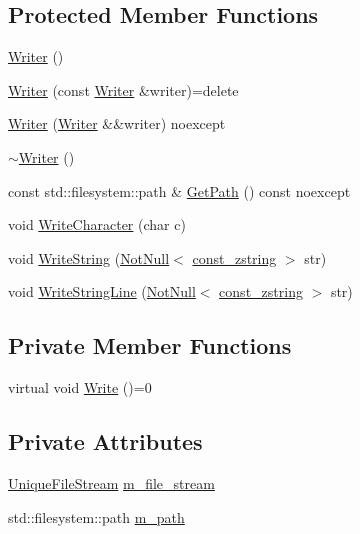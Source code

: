 \subsection*{Protected Member Functions}
\begin{DoxyCompactItemize}
\item 
\mbox{\hyperlink{classmage_1_1_writer_a40b6cd3005d509e670c5a49272d9ef27}{Writer}} ()
\item 
\mbox{\hyperlink{classmage_1_1_writer_a2b257938508732ca0b78241aafa7922c}{Writer}} (const \mbox{\hyperlink{classmage_1_1_writer}{Writer}} \&writer)=delete
\item 
\mbox{\hyperlink{classmage_1_1_writer_abda6f6db577201580c0e97c0816e0d3f}{Writer}} (\mbox{\hyperlink{classmage_1_1_writer}{Writer}} \&\&writer) noexcept
\item 
\mbox{\hyperlink{classmage_1_1_writer_aeeb30d6afb1a271b4ad294889054caec}{$\sim$\+Writer}} ()
\item 
const std\+::filesystem\+::path \& \mbox{\hyperlink{classmage_1_1_writer_ab023ae8174132f233c6e1fa4d3a2a1c8}{Get\+Path}} () const noexcept
\item 
void \mbox{\hyperlink{classmage_1_1_writer_aa1ef04f5e69c44afda56704c2823316c}{Write\+Character}} (char c)
\item 
void \mbox{\hyperlink{classmage_1_1_writer_a0efdf73186727b2ae95072b62eddcf5b}{Write\+String}} (\mbox{\hyperlink{namespacemage_a8769f9d670d6b585ea306cb1062af94b}{Not\+Null}}$<$ \mbox{\hyperlink{namespacemage_abfd9206dc607ceb5d13ec68bf075a5c0}{const\+\_\+zstring}} $>$ str)
\item 
void \mbox{\hyperlink{classmage_1_1_writer_abdfd1361df7bb66e284d031f92c85c05}{Write\+String\+Line}} (\mbox{\hyperlink{namespacemage_a8769f9d670d6b585ea306cb1062af94b}{Not\+Null}}$<$ \mbox{\hyperlink{namespacemage_abfd9206dc607ceb5d13ec68bf075a5c0}{const\+\_\+zstring}} $>$ str)
\end{DoxyCompactItemize}
\subsection*{Private Member Functions}
\begin{DoxyCompactItemize}
\item 
virtual void \mbox{\hyperlink{classmage_1_1_writer_a9baf695ef7f6180bef883f60bcb3ac07}{Write}} ()=0
\end{DoxyCompactItemize}
\subsection*{Private Attributes}
\begin{DoxyCompactItemize}
\item 
\mbox{\hyperlink{namespacemage_ac11c62400d336d9f6857c7cdaecfc7a8}{Unique\+File\+Stream}} \mbox{\hyperlink{classmage_1_1_writer_ac4884215d1b547e990633474bf61c470}{m\+\_\+file\+\_\+stream}}
\item 
std\+::filesystem\+::path \mbox{\hyperlink{classmage_1_1_writer_a1cc2c110c2652818a7bfdccc8c240fe6}{m\+\_\+path}}
\end{DoxyCompactItemize}


